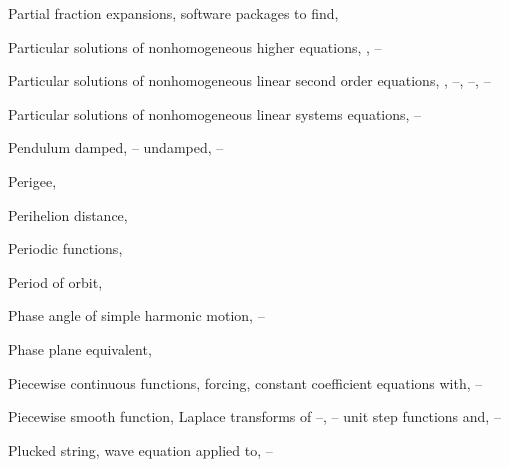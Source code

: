 \begin{theindex}
  \item Partial fraction expansions, software packages to find, \pageref{exer:8.2.1}

  \item Particular solutions of nonhomogeneous higher equations, \pageref{thmtype:9.1.5}, \pageref{eq:9.3.1}--\pageref{exer:9.4.42}

  \item Particular solutions of nonhomogeneous linear second order equations, \pageref{eq:5.3.2}, \pageref{thmtype:5.3.3}--\pageref{eq:5.3.17}, \pageref{eq:5.4.1}--\pageref{example:5.4.7}, \pageref{eq:5.7.1}--\pageref{eq:5.7.24}

  \item Particular solutions of nonhomogeneous linear systems equations, \pageref{thmtype:10.7.1}--\pageref{exer:10.7.23}

  \item Pendulum
    \subitem damped, \pageref{example:4.4.5}--\pageref{exer:4.4.1}
    \subitem undamped, \pageref{eq:4.4.26}--\pageref{eq:4.4.17}

  \item Perigee, \pageref{eq:6.4.11}

  \item Perihelion distance, \pageref{eq:6.4.11}

  \item Periodic functions, \pageref{exer:8.1.17}

  \item Period of orbit, \pageref{eq:6.4.1}

  \item Phase angle of simple harmonic motion, \pageref{eq:6.1.10}--\pageref{example:6.1.2}

  \item Phase plane equivalent, \pageref{eq:4.4.4}

  \item Piecewise continuous functions, \pageref{thmtype:8.1.4}
    \subitem forcing, constant coefficient equations with, \pageref{eq:8.5.1}--\pageref{exer:8.5.26}

  \item Piecewise smooth function, \pageref{thmtype:11.2.3}
    \subitem Laplace transforms of \pageref{eq:8.1.12}--\pageref{example:8.1.11}, \pageref{eq:8.4.4}--\pageref{exer:8.4.36}
      \subsubitem unit step functions and, \pageref{eq:8.4.1}--\pageref{exer:8.4.36}

  \item Plucked string, wave equation applied to, \pageref{eq:12.2.21}--\pageref{exer:12.2.1}


\end{theindex}
